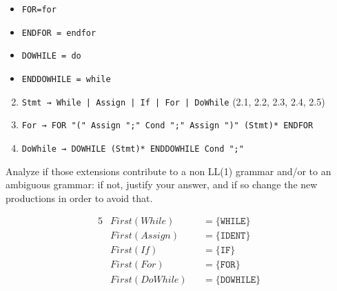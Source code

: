 \documentclass[docid=2019]{comp_exam_round2}
\begin{document}
\ansseparator

\begin{itemize}[wide, noitemsep, label={}]
    \item \texttt{FOR=for}
    \item \texttt{ENDFOR = endfor}
    \item \texttt{DOWHILE = do}
    \item \texttt{ENDDOWHILE = while}
\end{itemize}

\begin{enumerate}
    \setcounter{enumi}{1}
    \item \texttt{Stmt → While | Assign | If | For | DoWhile} (2.1, 2.2, 2.3, 2.4, 2.5)
    \setcounter{enumi}{10}
    \item \texttt{For → FOR "(" Assign ";" Cond ";" Assign ")" (Stmt)* ENDFOR}
    \item \texttt{DoWhile → DOWHILE (Stmt)* ENDDOWHILE Cond ";"}
\end{enumerate}

\question
Analyze if those extensions contribute to a non LL(1) grammar and/or to an ambiguous grammar: if not, justify your answer, and if so change the new productions in order to avoid that.

\ansseparator

\vspace{-2.0em}
\begin{alignat*}{5}
    & First (While)   &&= \{ \texttt{WHILE}                                                                  \} \\
    & First (Assign)  &&= \{ \texttt{IDENT}                                                                  \} \\
    & First (If)      &&= \{ \texttt{IF}                                                                     \} \\
    & First (For)     &&= \{ \texttt{FOR}                                                                    \} \\
    & First (DoWhile) &&= \{ \texttt{DOWHILE}                                                                \} \\
\end{alignat*}

\vspace{-3.0em}
\end{document}
